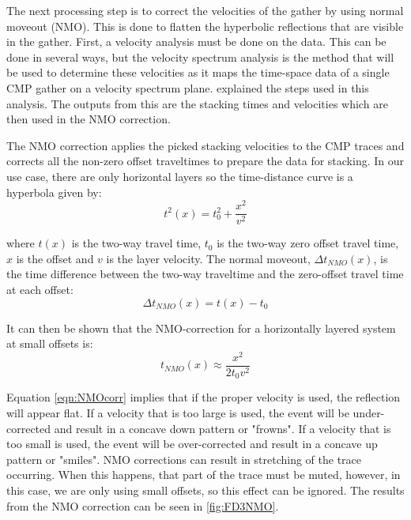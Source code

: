 \documentclass[12pt]{article}
\begin{document}
	The next processing step is to correct the velocities of the gather by using normal moveout (NMO). This is done to flatten the hyperbolic reflections that are visible in the gather. First, a velocity analysis must be done on the data. This can be done in several ways, but the velocity spectrum analysis is the method that will be used to determine these velocities as it maps the time-space data of a single CMP gather on a velocity spectrum plane. \cite{mousa2011} explained the steps used in this analysis. The outputs from this are the stacking times and velocities which are then used in the NMO correction.
	
	The NMO correction applies the picked stacking velocities to the CMP traces and corrects all the non-zero offset traveltimes to prepare the data for stacking. In our use case, there are only horizontal layers so the time-distance curve is a hyperbola given by:
\begin{equation}
	\label{eqn:hyperbola}
	t^2(x)=t_0^2+\frac{x^2}{v^2}
\end{equation}

\noindent where $t(x)$ is the two-way travel time, $t_0$ is the two-way zero offset travel time, $x$ is the offset and $v$ is the layer velocity. The normal moveout, $\Delta t_{NMO}(x)$, is the time difference between the two-way traveltime and the zero-offset travel time at each offset:
\begin{equation}
	\label{eqn:dtNMO}
	\Delta t_{NMO}(x)=t(x)-t_0
\end{equation}

\noindent It can then be shown that the NMO-correction for a horizontally layered system at small offsets is:
\begin{equation}
	\label{eqn:NMOcorr}
	t_{NMO}(x)\approx \frac{x^2}{2t_0 v^2}
\end{equation}

\noindent Equation \ref{eqn:NMOcorr} implies that if the proper velocity is used, the reflection will appear flat. If a velocity that is too large is used, the event will be under-corrected and result in a concave down pattern or "frowns". If a velocity that is too small is used, the event will be over-corrected and result in a concave up pattern or "smiles". NMO corrections can result in stretching of the trace occurring. When this happens, that part of the trace must be muted, however, in this case, we are only using small offsets, so this effect can be ignored. The results from the NMO correction can be seen in \ref{fig:FD3NMO}.
\end{document}
